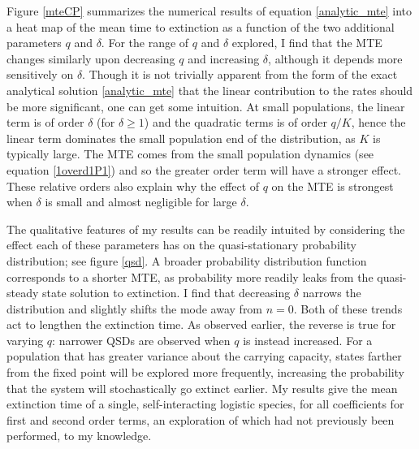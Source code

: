 Figure \ref{mteCP} summarizes the numerical results of equation \ref{analytic_mte} into a heat map of the mean time to extinction as a function of the two additional parameters $q$ and $\delta$.
For the range of $q$ and $\delta$ explored, I find that the MTE changes similarly upon decreasing $q$ and increasing $\delta$, although it depends more sensitively on $\delta$. 
Though it is not trivially apparent from the form of the exact analytical solution \ref{analytic_mte} that the linear contribution to the rates should be more significant, one can get some intuition. %
At small populations, the linear term is of order $\delta$ (for $\delta \geq 1$) and the quadratic terms is of order $q/K$, hence the linear term dominates the small population end of the distribution, as $K$ is typically large. 
The MTE comes from the small population dynamics (see equation \ref{1overd1P1}) and so the greater order term will have a stronger effect. 
These relative orders also explain why the effect of $q$ on the MTE is strongest when $\delta$ is small and almost negligible for large $\delta$. 

The qualitative features of my results can be readily intuited by considering the effect each of these parameters has on the quasi-stationary probability distribution; see figure \ref{qsd}. 
A broader probability distribution function corresponds to a shorter MTE, as probability more readily leaks from the quasi-steady state solution to extinction.
I find that decreasing $\delta$ narrows the distribution and slightly shifts the mode away from $n=0$. 
Both of these trends act to lengthen the extinction time. 
As observed earlier, the reverse is true for varying $q$: narrower QSDs are observed when $q$ is instead increased.
For a population that has greater variance about the carrying capacity, states farther from the fixed point will be explored more frequently, increasing the probability that the system will stochastically go extinct earlier. 
My results give the mean extinction time of a single, self-interacting logistic species, for all coefficients for first and second order terms, an exploration of which had not previously been performed, to my knowledge. 

